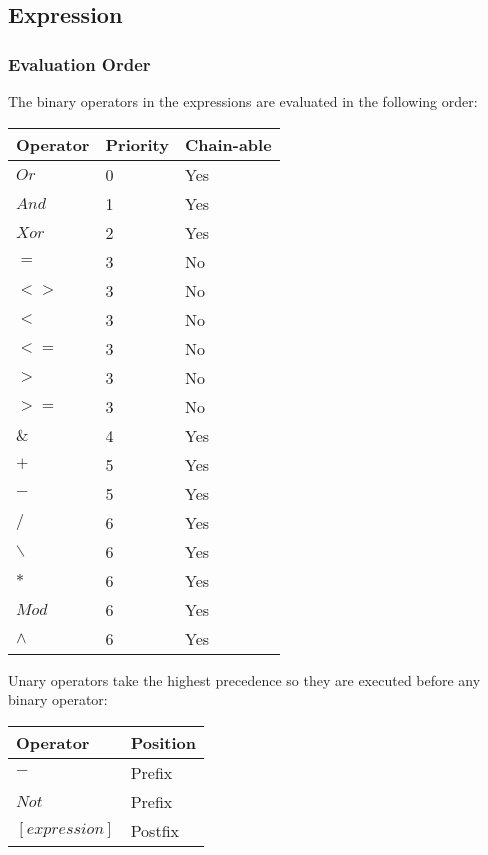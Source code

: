 \subsection{Expression}
\label{expr}

\subsubsection{Evaluation Order}
\label{evalord}
The binary operators in the expressions are evaluated in the following order:

\begin{threeparttable}
\begin{tabular}{l | l | l}
    Operator     & Priority & Chain-able \\
    \hline
    $Or$         & 0        & Yes        \\
    $And$        & 1        & Yes        \\
    $Xor$        & 2        & Yes        \\
    $=$          & 3        & No         \\
    $<>$         & 3        & No         \\
    $<$          & 3        & No         \\
    $<=$         & 3        & No         \\
    $>$          & 3        & No         \\
    $>=$         & 3        & No         \\
    $\&$         & 4        & Yes        \\
    $+$          & 5        & Yes        \\
    $-$          & 5        & Yes        \\
    $/$          & 6        & Yes        \\
    $\backslash$ & 6        & Yes        \\
    $\ast$       & 6        & Yes        \\
    $Mod$        & 6        & Yes        \\
    $\wedge$     & 6        & Yes        \\
\end{tabular}
\end{threeparttable}

Unary operators take the highest precedence
so they are executed before any binary operator:

\begin{threeparttable}
\begin{tabular}{l | l}
    Operator       & Position \\
    \hline
    $-$            & Prefix   \\
    $Not$          & Prefix   \\
    $[expression]$ & Postfix  \\
\end{tabular}
\end{threeparttable}

